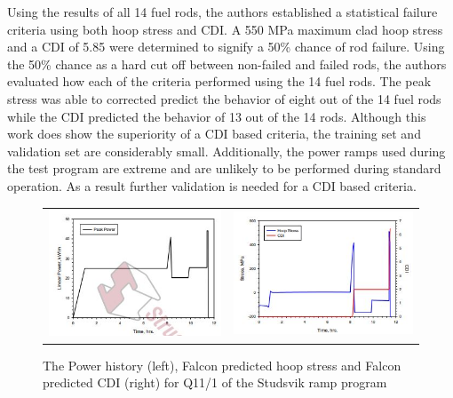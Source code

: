 \documentclass[edeposit,fullpage]{uiucthesis2009}
\begin{document}
Using the results of all 14 fuel rods, the authors established a statistical failure criteria using both hoop stress and \gls{CDI}.
A 550 MPa maximum clad hoop stress  and a \gls{CDI} of 5.85 were determined to signify a 50\% chance of rod failure.
Using the 50\% chance as a hard cut off between non-failed and failed rods, the authors evaluated how each of the criteria performed using the 14 fuel rods.
The peak stress was able to corrected predict the behavior of eight out of the 14 fuel rods while the \gls{CDI} predicted the behavior of 13 out of the 14 rods.
Although this work does show the superiority of a \gls{CDI} based criteria, the training set and validation set are considerably small.
Additionally, the power ramps used during the test program are extreme and are unlikely to be performed during standard operation.
As a result further validation is needed for a \gls{CDI} based criteria.
 
\begin{figure}
\begin{tabular}{cc}
\includegraphics[width=0.5\linewidth]{./Figures/lyon_image_6.JPG} & \includegraphics[width=0.5\linewidth]{./Figures/lyon_image_7.JPG}
\end{tabular}
\caption{The Power history (left), Falcon predicted hoop stress and Falcon predicted CDI (right) for Q11/1 of the Studsvik ramp program \cite{lyon_pci_2009}}
\label{fig:paper_3_res}
\end{figure}




\end{document}
